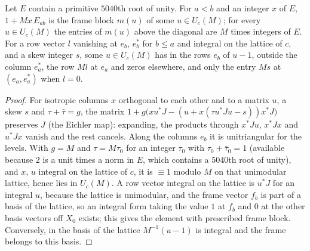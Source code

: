 \begin{lemma}\label{lem:eichler-elements}
Let $E$ contain a primitive $5040$th root of unity. For $a<b$ and an integer $x$ of $E$, $1+M x\,E_{ab}$ is the frame block $m(u)$ of some $u\in U_c(M)$; for every $u\in U_c(M)$ the entries of $m(u)$ above the diagonal are $M$ times integers of
$E$. For a row vector $l$ vanishing at $e_b$, $e^*_b$ for $b\le a$ and integral on the lattice of $c$, and a skew integer $s$, some $u\in U_c(M)$ has in the rows $e_b$ of $u-1$, outside the column $e^*_a$, the row $Ml$ at $e_a$ and zeros
elsewhere, and only the entry $Ms$ at $(e_a,e^*_a)$ when $l=0$.
\end{lemma}

\begin{proof}
For isotropic columns $x$ orthogonal to each other and to a matrix $u$, a skew $s$ and $\tau+\bar\tau=g$, the matrix $1+g\bigl(xu^*J-(u+x(\tau u^*Ju-s))x^*J\bigr)$ preserves $J$ (the Eichler map): expanding, the products through $x^*Ju$, $x^*Jx$ and $u^*Jx$ vanish
and the rest cancels. Along the columns $e_b$ it is unitriangular for the levels. With $g=M$ and $\tau=M\tau_0$ for an integer $\tau_0$ with $\tau_0+\bar\tau_0=1$ (available because $2$ is a unit times a norm in $E$, which contains a $5040$th root of unity), and
$x$, $u$ integral on the lattice of $c$, it is $\equiv1$ modulo $M$ on that unimodular lattice, hence lies in $U_c(M)$. A row vector integral on the lattice is $u^*J$ for an integral $u$, because the lattice is unimodular, and
the frame vector $f_b$ is part of a basis of the lattice, so an integral form taking the value $1$ at $f_b$ and $0$ at the other basis vectors off $X_0$ exists; this gives the element with prescribed frame block. Conversely, in the
basis of the lattice $M^{-1}(u-1)$ is integral and the frame belongs to this basis.
\end{proof}

